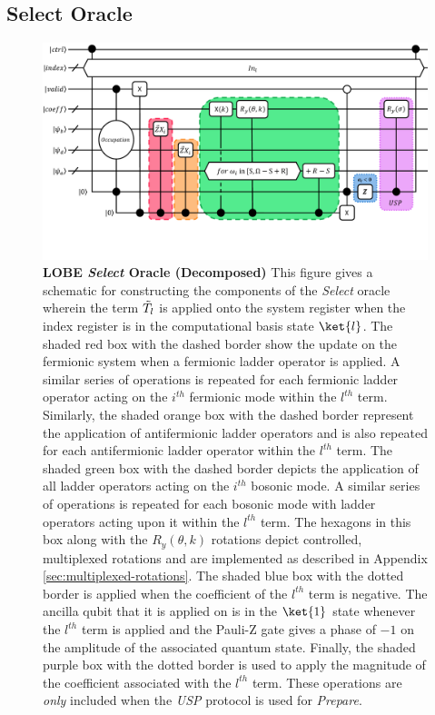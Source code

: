 \subsection{Select Oracle}
\label{subsec:select}

\begin{figure}
    \centering
    \includegraphics[width=16cm]{figures/select.pdf}
    \caption{
        \textbf{LOBE \textit{Select} Oracle (Decomposed)}
        This figure gives a schematic for constructing the components of the \textit{Select} oracle wherein the term $\Tilde{T_l}$ is applied onto the system register when the index register is in the computational basis state $\ket{l}$.
        The shaded red box with the dashed border show the update on the fermionic system when a fermionic ladder operator is applied.
        A similar series of operations is repeated for each fermionic ladder operator acting on the $i^{th}$ fermionic mode within the $l^{th}$ term.
        Similarly, the shaded orange box with the dashed border represent the application of antifermionic ladder operators and is also repeated for each antifermionic ladder operator within the $l^{th}$ term.
        The shaded green box with the dashed border depicts the application of all ladder operators acting on the $i^{th}$ bosonic mode.
        A similar series of operations is repeated for each bosonic mode with ladder operators acting upon it within the $l^{th}$ term.
        The hexagons in this box along with the $R_y(\theta, k)$ rotations depict controlled, multiplexed rotations and are implemented as described in Appendix \ref{sec:multiplexed-rotations}.
        The shaded blue box with the dotted border is applied when the coefficient of the $l^{th}$ term is negative.
        The ancilla qubit that it is applied on is in the $\ket{1}$ state whenever the $l^{th}$ term is applied and the Pauli-Z gate gives a phase of $-1$ on the amplitude of the associated quantum state.
        Finally, the shaded purple box with the dotted border is used to apply the magnitude of the coefficient associated with the $l^{th}$ term.
        These operations are \textit{only} included when the \textit{USP} protocol is used for \textit{Prepare}.
    }
    \label{fig:select}
\end{figure}

